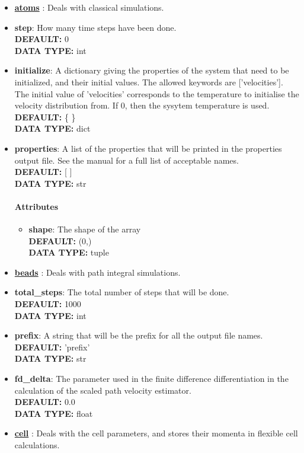 \begin{itemize}
\item {\bf \hyperref[ATOMS]{atoms} }:
 Deals with classical simulations.
\item {\bf step}:
 How many time steps have been done.
{\\ \bf DEFAULT: }0
{\\ \bf DATA TYPE: }int
\item {\bf initialize}:
 A dictionary giving the properties of the system that need to be initialized, and their initial values. The allowed keywords are ['velocities']. The initial value of 'velocities' corresponds to the temperature to initialise the velocity distribution from. If 0, then the sysytem temperature is used.
{\\ \bf DEFAULT: }\{ \}
{\\ \bf DATA TYPE: }dict
\item {\bf properties}:
 A list of the properties that will be printed in the properties output file. See the manual for a full list of acceptable names.
{\\ \bf DEFAULT: }[ ]
{\\ \bf DATA TYPE: }str
\paragraph{Attributes}
 \begin{itemize}
\item {\bf shape}:
 The shape of the array
{\\ \bf DEFAULT: }(0,)
{\\ \bf DATA TYPE: }tuple
\end{itemize}
 
\item {\bf \hyperref[BEADS]{beads} }:
 Deals with path integral simulations.
\item {\bf total\_steps}:
 The total number of steps that will be done.
{\\ \bf DEFAULT: }1000
{\\ \bf DATA TYPE: }int
\item {\bf prefix}:
 A string that will be the prefix for all the output file names.
{\\ \bf DEFAULT: }'prefix'
{\\ \bf DATA TYPE: }str
\item {\bf fd\_delta}:
 The parameter used in the finite difference differentiation in the calculation of the scaled path velocity estimator.
{\\ \bf DEFAULT: }0.0
{\\ \bf DATA TYPE: }float
\item {\bf \hyperref[CELL]{cell} }:
 Deals with the cell parameters, and stores their momenta in flexible cell calculations.

\end{itemize}
